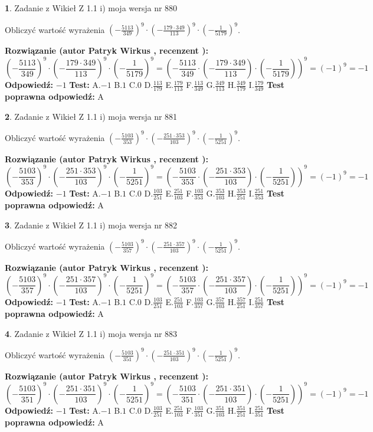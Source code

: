 \documentclass[12pt, a4paper]{article}
\theoremstyle{definition} %
\newtheorem{zad}{}
\newcommand{\zadStart}[1]{\begin{zad}#1\newline}
\newcommand{\zadStop}{\end{zad}}
\newcommand{\rozwStart}[2]{\noindent \textbf{Rozwiązanie (autor #1 , recenzent #2): }\newline}
\newcommand{\rozwStop}{\newline}
\newcommand{\odpStart}{\noindent \textbf{Odpowiedź:}\newline}
\newcommand{\odpStop}{\newline}
\newcommand{\testStart}{\noindent \textbf{Test:}\newline}
\newcommand{\testStop}{\newline}
\newcommand{\kluczStart}{\noindent \textbf{Test poprawna odpowiedź:}\newline}
\newcommand{\kluczStop}{\newline}
\begin{document}
\zadStart{Zadanie z Wikieł Z 1.1 i) moja wersja nr 880}

Obliczyć wartość wyrażenia $(-\frac{5113}{349})^{9} \cdot (-\frac{179 \cdot 349}{113})^{9} \cdot (-\frac{1}{5179})^{9}$.
\zadStop
\rozwStart{Patryk Wirkus}{}
$$(-\frac{5113}{349})^{9} \cdot (-\frac{179 \cdot 349}{113})^{9} \cdot (-\frac{1}{5179})^{9} = (-\frac{5113}{349} \cdot (-\frac{179 \cdot 349}{113}) \cdot (-\frac{1}{5179}))^{9} = (-1)^{9} = -1$$
\rozwStop
\odpStart
$-1$
\odpStop
\testStart
A.$-1$ B.$1$ C.$0$ D.$\frac{113}{179}$ E.$\frac{179}{113}$
F.$\frac{113}{349}$ G.$\frac{349}{113}$
H.$\frac{349}{179}$
I.$\frac{179}{349}$
\testStop
\kluczStart
A
\kluczStop



\zadStart{Zadanie z Wikieł Z 1.1 i) moja wersja nr 881}

Obliczyć wartość wyrażenia $(-\frac{5103}{353})^{9} \cdot (-\frac{251 \cdot 353}{103})^{9} \cdot (-\frac{1}{5251})^{9}$.
\zadStop
\rozwStart{Patryk Wirkus}{}
$$(-\frac{5103}{353})^{9} \cdot (-\frac{251 \cdot 353}{103})^{9} \cdot (-\frac{1}{5251})^{9} = (-\frac{5103}{353} \cdot (-\frac{251 \cdot 353}{103}) \cdot (-\frac{1}{5251}))^{9} = (-1)^{9} = -1$$
\rozwStop
\odpStart
$-1$
\odpStop
\testStart
A.$-1$ B.$1$ C.$0$ D.$\frac{103}{251}$ E.$\frac{251}{103}$
F.$\frac{103}{353}$ G.$\frac{353}{103}$
H.$\frac{353}{251}$
I.$\frac{251}{353}$
\testStop
\kluczStart
A
\kluczStop



\zadStart{Zadanie z Wikieł Z 1.1 i) moja wersja nr 882}

Obliczyć wartość wyrażenia $(-\frac{5103}{357})^{9} \cdot (-\frac{251 \cdot 357}{103})^{9} \cdot (-\frac{1}{5251})^{9}$.
\zadStop
\rozwStart{Patryk Wirkus}{}
$$(-\frac{5103}{357})^{9} \cdot (-\frac{251 \cdot 357}{103})^{9} \cdot (-\frac{1}{5251})^{9} = (-\frac{5103}{357} \cdot (-\frac{251 \cdot 357}{103}) \cdot (-\frac{1}{5251}))^{9} = (-1)^{9} = -1$$
\rozwStop
\odpStart
$-1$
\odpStop
\testStart
A.$-1$ B.$1$ C.$0$ D.$\frac{103}{251}$ E.$\frac{251}{103}$
F.$\frac{103}{357}$ G.$\frac{357}{103}$
H.$\frac{357}{251}$
I.$\frac{251}{357}$
\testStop
\kluczStart
A
\kluczStop



\zadStart{Zadanie z Wikieł Z 1.1 i) moja wersja nr 883}

Obliczyć wartość wyrażenia $(-\frac{5103}{351})^{9} \cdot (-\frac{251 \cdot 351}{103})^{9} \cdot (-\frac{1}{5251})^{9}$.
\zadStop
\rozwStart{Patryk Wirkus}{}
$$(-\frac{5103}{351})^{9} \cdot (-\frac{251 \cdot 351}{103})^{9} \cdot (-\frac{1}{5251})^{9} = (-\frac{5103}{351} \cdot (-\frac{251 \cdot 351}{103}) \cdot (-\frac{1}{5251}))^{9} = (-1)^{9} = -1$$
\rozwStop
\odpStart
$-1$
\odpStop
\testStart
A.$-1$ B.$1$ C.$0$ D.$\frac{103}{251}$ E.$\frac{251}{103}$
F.$\frac{103}{351}$ G.$\frac{351}{103}$
H.$\frac{351}{251}$
I.$\frac{251}{351}$
\testStop
\kluczStart
A
\kluczStop
\end{document}
